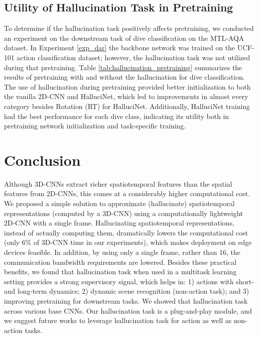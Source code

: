 \documentclass[10pt,twocolumn,letterpaper]{article}
\begin{document}
\subsection{Utility of Hallucination Task in Pretraining}
\label{exp_pretraining}
To determine if the hallucination task positively affects pretraining, we conducted an experiment on the downstream task of dive classification on the MTL-AQA dataset. In Experiment \ref{exp_dar} the backbone network was trained on the UCF-101 action classification dataset; however, the hallucination task was not utilized during that pretraining.  Table \ref{tab:hallucination_pretraining} summarizes the results of pretraining with and without the hallucination for dive classification.  The use of hallucination during pretraining provided better initialization to both the vanilla 2D-CNN and HalluciNet, which led to improvements in almost every category besides Rotation (RT) for HalluciNet.  Additionally, HalluciNet training had the best performance for each dive class, indicating its utility both in pretraining network initialization and task-specific training.   \section{Conclusion}
Although 3D-CNNs extract richer spatiotemporal features than the spatial features from 2D-CNNs, this comes at a considerably higher computational cost. We proposed a simple solution to approximate (hallucinate) spatiotemporal  representations (computed by a 3D-CNN) using a computationally lightweight 2D-CNN with a single frame. Hallucinating spatiotemporal representations, instead of actually computing them, dramatically lowers the computational cost (only 6\% of 3D-CNN time in our experiments), which makes deployment on edge devices feasible. In addition, by using only a single frame, rather than 16, the communication bandwidth requirements are lowered. Besides these practical benefits, we found that hallucination task when used in a multitask learning setting provides a strong supervisory signal, which helps in: 1) actions with short- and long-term dynamics; 2) dynamic scene recognition (non-action task); and 3) improving pretraining for downstream tasks. We showed that hallucination task across various base CNNs. Our hallucination task is a plug-and-play module, and we suggest future works to leverage hallucination task for action as well as non-action tasks. 

{\small


}
\end{document}
